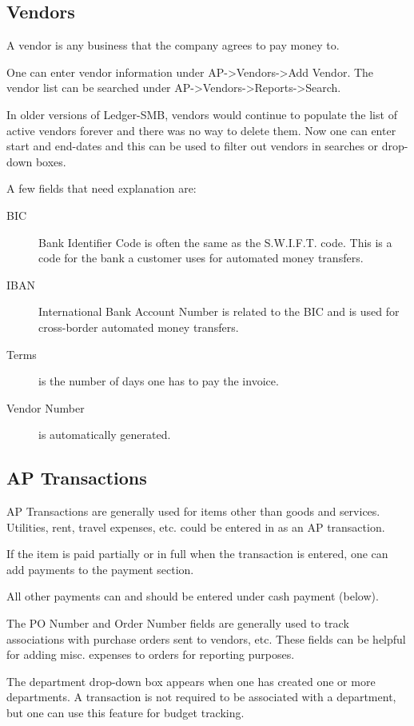 \documentclass{article}
\begin{document}
\subsection{Vendors}
A vendor is any business that the company agrees to pay money to.

One can enter vendor information under AP-\textgreater Vendors-\textgreater Add Vendor.  The vendor list
can be searched under AP-\textgreater Vendors-\textgreater Reports-\textgreater Search.

In older versions of Ledger-SMB, vendors would continue to populate the list of
active vendors forever and there was no way to delete them.  Now one can enter
start and end-dates and this can be used to filter out vendors in searches or
drop-down boxes.

A few fields that need explanation are:
\begin{description}
\item[BIC] Bank Identifier Code is often the same as the S.W.I.F.T. code.  This
is a code for the bank a customer uses for automated money transfers.
\item[IBAN]  International Bank Account Number is related to the BIC and is used
for cross-border automated money transfers.
\item[Terms] is the number of days one has to pay the invoice.
\item[Vendor Number] is automatically generated.
\end{description}

\subsection{AP Transactions}
AP Transactions are generally used for items other than goods and services.
Utilities, rent, travel expenses, etc. could be entered in as an AP transaction.

If the item is paid partially or in full when the transaction is entered, one
can add payments to the payment section.

All other payments can and should be entered under cash payment (below).

The PO Number and Order Number fields are generally used to track associations
with purchase orders sent to vendors, etc.  These fields can be helpful for
adding misc. expenses to orders for reporting purposes.

The department drop-down box appears when one has created one or more
departments.  A transaction is not required to be associated with a department,
but one can use this feature for budget tracking.
\end{document}
